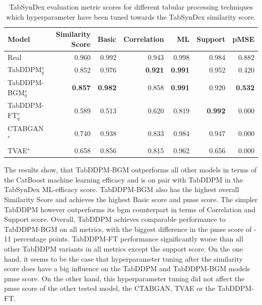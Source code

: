 \begin{table}[h]
	\centering
	\begin{tabular}{lrrrrrr}
		\toprule
		\textbf{Model}        & \textbf{Similarity Score} & \textbf{Basic} & \textbf{Correlation} & \textbf{ML}    & \textbf{Support} & \textbf{pMSE}  \\
		\midrule
		Real                  & 0.960                     & 0.992          & 0.943                & 0.998          & 0.984            & 0.882          \\
		TabDDPM$^{s}_{q}$     & 0.852                     & 0.976          & \textbf{0.921}       & \textbf{0.991} & 0.952            & 0.420          \\
		TabDDPM-BGM$^{s}_{q}$ & \textbf{0.857}            & \textbf{0.982} & 0.858                & \textbf{0.991} & 0.920            & \textbf{0.532} \\
		TabDDPM-FT$^{s}_{q}$  & 0.589                     & 0.513          & 0.620                & 0.819          & \textbf{0.992}   & 0.000          \\
		CTABGAN$^{s}$         & 0.740                     & 0.938          & 0.833                & 0.984          & 0.947            & 0.000          \\
		TVAE$^{s}$            & 0.658                     & 0.856          & 0.815                & 0.962          & 0.656            & 0.000          \\
		\bottomrule
	\end{tabular}
	\caption[Experiment2-Similarity]{TabSynDex evaluation metric scores for different tabular processing techniques which hyperparameter have been tuned towards the TabSynDex similarity score.}
	\label{tab:exp2-sim}
\end{table}

The results show, that TabDDPM-BGM outperforms all other models in terms of the CatBoost machine learning efficacy and is on pair with TabDDPM in the TabSynDex ML-efficacy score.
TabDDPM-BGM also has the highest overall Similarity Score and achieves the highest Basic score and \gls{pmse} score.
The simpler TabDDPM however outperforms its \gls{bgm} counterpart in terms of Correlation and Support score.
Overall, TabDDPM achieves comparable performance to TabDDPM-BGM on all metrics, with the biggest difference in the \gls{pmse} score of - 11 percentage points.
TabDDPM-FT performance significantly worse than all other TabDDPM variants in all metrics except the support score.
On the one hand, it seems to be the case that hyperparameter tuning after the similarity score does have a big influence on the TabDDPM and TabDDPM-BGM models \gls{pmse} score.
On the other hand, this hyperparameter tuning did not affect the \gls{pmse} score of the other tested model, the CTABGAN, TVAE or the TabDDPM-FT.


